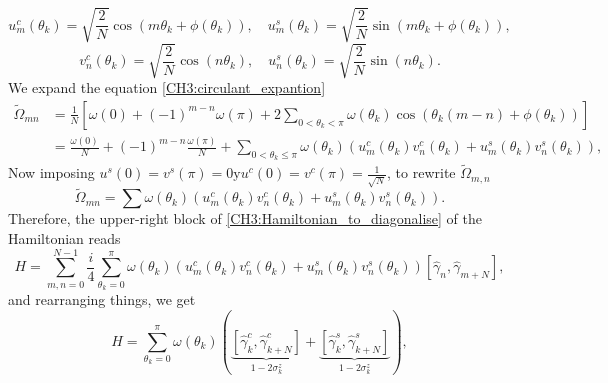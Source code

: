 \begin{equation}
u_{m}^{c}\left(\theta_{k}\right)=\sqrt{\frac{2}{N}} \cos \left(m \theta_{k}+\phi\left(\theta_{k}\right)\right), \quad u_{m}^{s}\left(\theta_{k}\right)=\sqrt{\frac{2}{N}} \sin \left(m \theta_{k}+\phi\left(\theta_{k}\right)\right),
\end{equation}
\begin{equation}
v_{n}^{c}\left(\theta_{k}\right)=\sqrt{\frac{2}{N}} \cos \left(n \theta_{k}\right), \quad u_{n}^{s}\left(\theta_{k}\right)=\sqrt{\frac{2}{N}} \sin \left(n \theta_{k}\right).
\end{equation}
We expand the equation \eqref{CH3:circulant_expantion}
\begin{equation}
\begin{aligned}
\tilde{\Omega}_{m n} &=\frac{1}{N}\left[\omega(0)+(-1)^{m-n} \omega(\pi)+2 \sum_{0<\theta_{k}<\pi} \omega\left(\theta_{k}\right) \cos \left(\theta_{k}(m-n)+\phi\left(\theta_{k}\right)\right)\right] \\
&=\frac{\omega(0)}{N}+(-1)^{m-n} \frac{\omega(\pi)}{N}+\sum_{0<\theta_{k} \leq \pi} \omega\left(\theta_{k}\right)\left(u_{m}^{c}\left(\theta_{k}\right) v_{n}^{c}\left(\theta_{k}\right)+u_{m}^{s}\left(\theta_{k}\right) v_{n}^{s}\left(\theta_{k}\right)\right),
\end{aligned}
\end{equation}
Now imposing $u^{s}(0) = v^{s}(\pi)=0 \mathrm{y} u^{c}(0)=v^{c}(\pi)=\frac{1}{\sqrt{N}}$, to rewrite $\tilde{\Omega}_{m,n}$
\begin{equation}
\tilde{\Omega}_{m n}=\sum \omega\left(\theta_{k}\right)\left(u_{m}^{c}\left(\theta_{k}\right) v_{n}^{c}\left(\theta_{k}\right)+u_{m}^{s}\left(\theta_{k}\right) v_{n}^{s}\left(\theta_{k}\right)\right).
\label{CH2:transformation_half}
\end{equation}
Therefore, the upper-right block of \eqref{CH3:Hamiltonian_to_diagonalise} of the Hamiltonian reads
\begin{equation}
H=\sum_{m, n=0}^{N-1} \frac{i}{4} \sum_{\theta_{k}=0}^{\pi} \omega\left(\theta_{k}\right)\left(u_{m}^{c}\left(\theta_{k}\right) v_{n}^{c}\left(\theta_{k}\right)+u_{m}^{s}\left(\theta_{k}\right) v_{n}^{s}\left(\theta_{k}\right)\right)\left[\hat{\gamma}_{n}, \hat{\gamma}_{m+N}\right],
\end{equation}
and rearranging things, we get
\begin{equation}
H=\sum_{\theta_{k}=0}^{\pi} \omega\left(\theta_{k}\right)(\underbrace{\left[\hat{\gamma}_{k}^{c}, \hat{\gamma}_{k+N}^{c}\right]}_{1-2\sigma^{z     }_k}+\underbrace{\left[\hat{\gamma}_{k}^{s}, \hat{\gamma}_{k+N}^{s}\right]}_{1-2\sigma^{z}_k}),
\end{equation}
